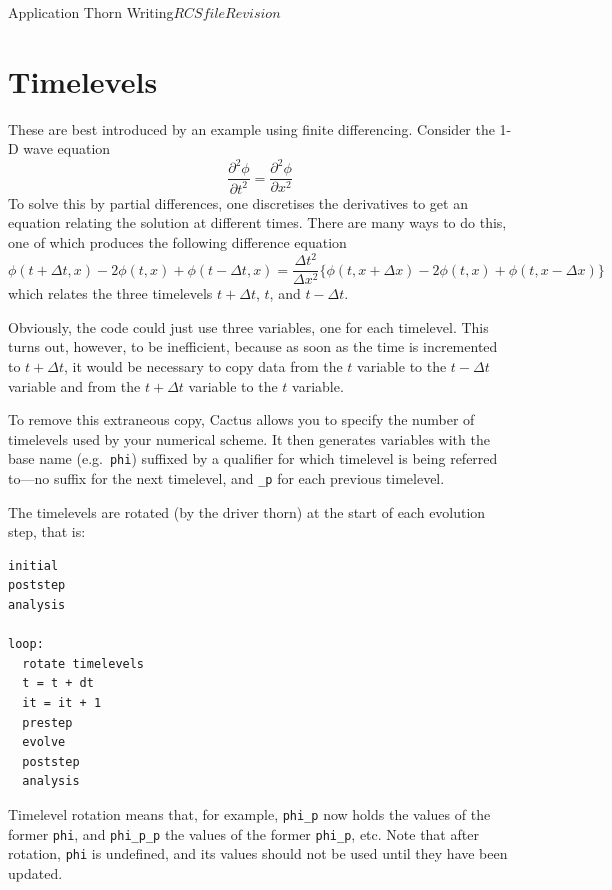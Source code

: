 \begin{cactuspart}{Application Thorn Writing}{$RCSfile$}{$Revision$}

\section{Timelevels}

These are best introduced by an example using finite differencing.
Consider the 1-D wave equation
\begin{equation}
\frac{\partial^2 \phi}{\partial t^2} = \frac{\partial^2 \phi}{\partial x^2}
\end{equation}
To solve this by partial differences, one discretises the derivatives to get
an equation relating the solution at different times.  There are many ways
to do this, one of which produces the following difference equation
\begin{equation}
\label{equation:difference}
\phi(t+\Delta t,x) -2\phi(t,x) +\phi(t-\Delta t,x) = \frac{\Delta t^2}{\Delta x^2} \lbrace{\phi(t,x+\Delta x) -2\phi(t,x) +\phi(t,x-\Delta x)}\rbrace
\end{equation}
which relates the three timelevels $t+\Delta t$, $t$, and $t-\Delta t$.

Obviously, the code could just use three variables, one for each timelevel.
This turns out, however, to be inefficient, because as soon as the time is
incremented to $t+\Delta t$, it would be necessary to copy data from the
$t$ variable to the $t-\Delta t$ variable and from the $t+\Delta t$ variable
to the $t$ variable.

To remove this extraneous copy, Cactus allows you to specify the number
of timelevels used by your numerical scheme.  It then generates variables
with the base name (e.g.\ \texttt{phi}) suffixed by a qualifier for
which timelevel is being referred to---no suffix for the
next timelevel, and \texttt{\_p} for each previous timelevel.

The timelevels are rotated (by the driver thorn) at the start
of each evolution step, that is:
\begin{verbatim}
initial
poststep
analysis

loop:
  rotate timelevels
  t = t + dt
  it = it + 1
  prestep
  evolve
  poststep
  analysis
\end{verbatim}

Timelevel rotation means that, for example,
\texttt{phi\_p} now holds the values of the former \texttt{phi},
and \texttt{phi\_p\_p} the values of the former \texttt{phi\_p}, etc.
Note that after rotation, \texttt{phi} is  undefined, and its values should
not be used until they have been updated.


\end{cactuspart}
